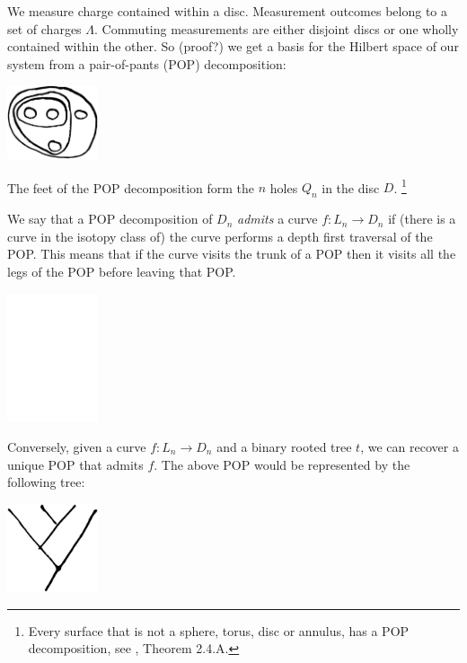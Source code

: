 \documentclass[12pt,a4paper]{article}
\begin{document}


We measure charge contained within a disc. %
Measurement outcomes belong to a set of charges $\Lambda.$
Commuting measurements are either disjoint discs or
one wholly contained within the other.
So (proof?) we get a basis for the Hilbert space of our system from
a pair-of-pants (POP) decomposition:

\begin{center}
\includegraphics[width=0.2\textwidth]{POP-1.eps}
\end{center}

The feet of the POP decomposition form the $n$ holes $Q_n$ in the disc $D$.
\footnote{Every surface that is not a sphere, torus, disc or annulus, has
a POP decomposition, see \cite{Ivanov01}, Theorem 2.4.A.}

We say that a POP decomposition of $D_n$
{\it admits} a curve $f:L_n\to D_n$
if (there is a curve in the isotopy class of)
the curve performs a depth first traversal of the POP.
This means that if the curve visits the trunk of a POP
then it visits all the legs of the POP before leaving that POP.

\begin{center}
\includegraphics[width=0.2\textwidth]{POP-2.eps}
\end{center}

Conversely, given a curve $f:L_n\to D_n$
and a binary rooted tree $t$,
we can recover a unique POP that admits $f$.
The above POP would be represented by the following tree:

\begin{center}
\includegraphics[width=0.2\textwidth]{POP-3.eps}
\end{center}
\end{document}
